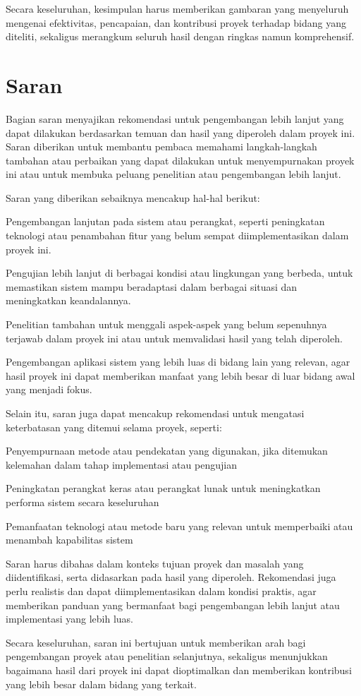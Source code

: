 Secara keseluruhan, kesimpulan harus memberikan gambaran yang menyeluruh mengenai efektivitas, pencapaian, dan kontribusi proyek terhadap bidang yang diteliti, sekaligus merangkum seluruh hasil dengan ringkas namun komprehensif.

\section{Saran}
Bagian saran menyajikan rekomendasi untuk pengembangan lebih lanjut yang dapat dilakukan berdasarkan temuan dan hasil yang diperoleh dalam proyek ini. Saran diberikan untuk membantu pembaca memahami langkah-langkah tambahan atau perbaikan yang dapat dilakukan untuk menyempurnakan proyek ini atau untuk membuka peluang penelitian atau pengembangan lebih lanjut.

Saran yang diberikan sebaiknya mencakup hal-hal berikut:
\begin{packed_item}
    \item Pengembangan lanjutan pada sistem atau perangkat, seperti peningkatan teknologi atau penambahan fitur yang belum sempat diimplementasikan dalam proyek ini.
    \item Pengujian lebih lanjut di berbagai kondisi atau lingkungan yang berbeda, untuk memastikan sistem mampu beradaptasi dalam berbagai situasi dan meningkatkan keandalannya.
    \item Penelitian tambahan untuk menggali aspek-aspek yang belum sepenuhnya terjawab dalam proyek ini atau untuk memvalidasi hasil yang telah diperoleh.
    \item Pengembangan aplikasi sistem yang lebih luas di bidang lain yang relevan, agar hasil proyek ini dapat memberikan manfaat yang lebih besar di luar bidang awal yang menjadi fokus.
\end{packed_item}

Selain itu, saran juga dapat mencakup rekomendasi untuk mengatasi keterbatasan yang ditemui selama proyek, seperti:
\begin{packed_item}
    \item Penyempurnaan metode atau pendekatan yang digunakan, jika ditemukan kelemahan dalam tahap implementasi atau pengujian
    \item Peningkatan perangkat keras atau perangkat lunak untuk meningkatkan performa sistem secara keseluruhan
    \item Pemanfaatan teknologi atau metode baru yang relevan untuk memperbaiki atau menambah kapabilitas sistem
\end{packed_item}

Saran harus dibahas dalam konteks tujuan proyek dan masalah yang diidentifikasi, serta didasarkan pada hasil yang diperoleh. Rekomendasi juga perlu realistis dan dapat diimplementasikan dalam kondisi praktis, agar memberikan panduan yang bermanfaat bagi pengembangan lebih lanjut atau implementasi yang lebih luas.

Secara keseluruhan, saran ini bertujuan untuk memberikan arah bagi pengembangan proyek atau penelitian selanjutnya, sekaligus menunjukkan bagaimana hasil dari proyek ini dapat dioptimalkan dan memberikan kontribusi yang lebih besar dalam bidang yang terkait.